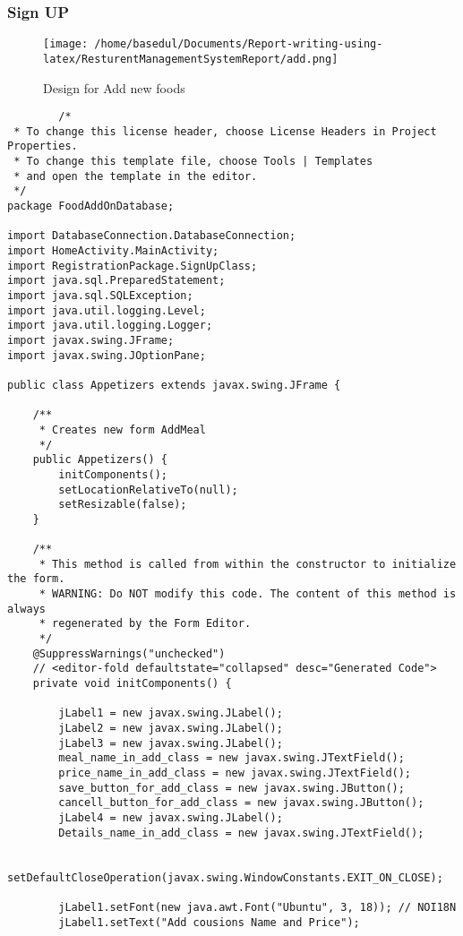 \documentclass[12pt,a4paper]{article}
\begin{document}
	\subsubsection{Sign UP}
		\begin{figure}[H]
		\centering
		\texttt{[image: /home/basedul/Documents/Report-writing-using-latex/ResturentManagementSystemReport/add.png]}
		\caption{Design for Add new foods}
		\label{fig:addfoods} 
\end{figure}
	\begin{lstlisting}
		/*
 * To change this license header, choose License Headers in Project Properties.
 * To change this template file, choose Tools | Templates
 * and open the template in the editor.
 */
package FoodAddOnDatabase;

import DatabaseConnection.DatabaseConnection;
import HomeActivity.MainActivity;
import RegistrationPackage.SignUpClass;
import java.sql.PreparedStatement;
import java.sql.SQLException;
import java.util.logging.Level;
import java.util.logging.Logger;
import javax.swing.JFrame;
import javax.swing.JOptionPane;

public class Appetizers extends javax.swing.JFrame {

    /**
     * Creates new form AddMeal
     */
    public Appetizers() {
        initComponents();
        setLocationRelativeTo(null);
        setResizable(false);
    }

    /**
     * This method is called from within the constructor to initialize the form.
     * WARNING: Do NOT modify this code. The content of this method is always
     * regenerated by the Form Editor.
     */
    @SuppressWarnings("unchecked")
    // <editor-fold defaultstate="collapsed" desc="Generated Code">                          
    private void initComponents() {

        jLabel1 = new javax.swing.JLabel();
        jLabel2 = new javax.swing.JLabel();
        jLabel3 = new javax.swing.JLabel();
        meal_name_in_add_class = new javax.swing.JTextField();
        price_name_in_add_class = new javax.swing.JTextField();
        save_button_for_add_class = new javax.swing.JButton();
        cancell_button_for_add_class = new javax.swing.JButton();
        jLabel4 = new javax.swing.JLabel();
        Details_name_in_add_class = new javax.swing.JTextField();

        setDefaultCloseOperation(javax.swing.WindowConstants.EXIT_ON_CLOSE);

        jLabel1.setFont(new java.awt.Font("Ubuntu", 3, 18)); // NOI18N
        jLabel1.setText("Add cousions Name and Price");


\end{lstlisting}
\end{document}
